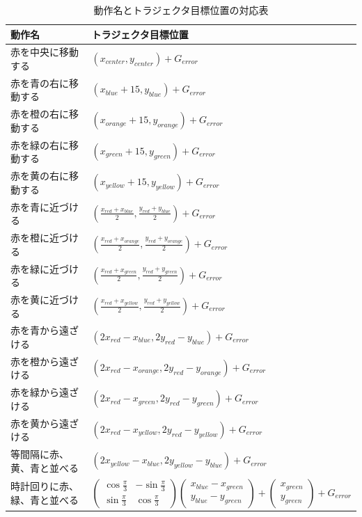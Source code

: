 \begin{table}[h]
	\caption{動作名とトラジェクタ目標位置の対応表}
	\label{table:taskname_15}
  	\begin{tabular}{|l|l|} \hline
    	動作名 & トラジェクタ目標位置\\ \hline
   	赤を中央に移動する & 
	$
    	\left( x_{center} , y_{center} \right)+G_{error}
    	$
    	\\
    	赤を青の右に移動する & 
	$
    	\left( x_{blue}+15 , y_{blue} \right)+G_{error}
    	$
    	\\
    	赤を橙の右に移動する & 
	$
    	\left( x_{orange}+15 , y_{orange} \right)+G_{error}
    	$
    	\\
    	赤を緑の右に移動する & 
	$
    	\left( x_{green}+15 , y_{green} \right)+G_{error}
    	$
    	\\
    	赤を黄の右に移動する & 
	$
    	\left( x_{yellow}+15 , y_{yellow} \right)+G_{error}
    	$
    	\\
    	赤を青に近づける & 
	$
    	\left( \frac{x_{red}+x_{blue}}{2} , \frac{y_{red}+y_{blue}}{2} \right)+G_{error}
    	$
    	\\
    	赤を橙に近づける & 
	$
    	\left( \frac{x_{red}+x_{orange}}{2} , \frac{y_{red}+y_{orange}}{2} \right)+G_{error}
    	$
    	\\
    	赤を緑に近づける & 
	$
    	\left( \frac{x_{red}+x_{green}}{2} , \frac{y_{red}+y_{green}}{2} \right)+G_{error}
    	$
    	\\
    	赤を黄に近づける & 
	$
    	\left( \frac{x_{red}+x_{yellow}}{2} , \frac{y_{red}+y_{yellow}}{2} \right)+G_{error}
    	$
    	\\
    	赤を青から遠ざける & 
	$
    	\left( 2x_{red}-x_{blue} , 2y_{red}-y_{blue} \right)+G_{error}
    	$
    	\\
    	赤を橙から遠ざける & 
	$
    	\left( 2x_{red}-x_{orange} , 2y_{red}-y_{orange} \right)+G_{error}
    	$
    	\\
    	赤を緑から遠ざける & 
	$
    	\left( 2x_{red}-x_{green} , 2y_{red}-y_{green} \right)+G_{error}
    	$
    	\\
    	赤を黄から遠ざける & 
	$
    	\left( 2x_{red}-x_{yellow} , 2y_{red}-y_{yellow} \right)+G_{error}
    	$
    	\\
    	等間隔に赤、黄、青と並べる & 
	$
    	\left( 2x_{yellow}-x_{blue} , 2y_{yellow}-y_{blue} \right)+G_{error}
    	$
    	\\
    	時計回りに赤、緑、青と並べる & 
	$
	\begin{pmatrix}
        	\cos \frac{\pi}{3} & -\sin \frac{\pi}{3} \\
        	\sin \frac{\pi}{3} & \cos \frac{\pi}{3}
	\end{pmatrix}
	\begin{pmatrix}
        	x_{blue}-x_{green} \\
        	y_{blue}-y_{green}
	\end{pmatrix}
      	+
	\begin{pmatrix}
        	x_{green} \\
        	y_{green}
	\end{pmatrix}      	
	+G_{error}
    	$
    	\\ \hline
  	\end{tabular}
\end{table}
